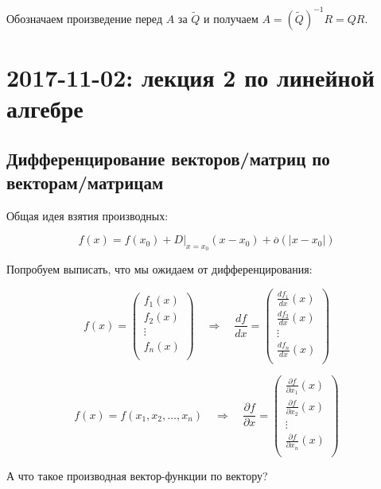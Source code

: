 \documentclass[12pt]{article}
\begin{document}
Обозначаем произведение перед $A$ за $\tilde{Q}$ и получаем $A = \left(\tilde{Q}\right)^{-1} R = QR$.

\section{2017-11-02: лекция 2 по линейной алгебре}

\subsection{Дифференцирование векторов/матриц по векторам/матрицам}

Общая идея взятия производных:

\[
f(x) = f(x_0) + D|_{x=x_0} (x-x_0) + \overline{o} \left( |x-x_0| \right)
\]



Попробуем выписать, что мы ожидаем от дифференцирования:

\[
f(x) =
\begin{pmatrix}
f_1(x) \\
f_2(x) \\
\vdots \\
f_n(x) \\
\end{pmatrix}
\quad \Rightarrow \quad
\frac {df} {dx} =
\begin{pmatrix}
\frac {df_1} {dx} (x) \\
\frac {df_2} {dx} (x) \\
\vdots \\
\frac {df_n} {dx} (x) \\
\end{pmatrix}
\]

\[
f(x) = f(x_1, x_2, \ldots, x_n)
\quad \Rightarrow \quad
\frac {\partial f} {\partial x} =
\begin{pmatrix}
\frac {\partial f} {\partial x_1} (x) \\
\frac {\partial f} {\partial x_2} (x) \\
\vdots \\
\frac {\partial f} {\partial x_n} (x) \\
\end{pmatrix}
\]

А что такое производная вектор-функции по вектору?
\end{document}
